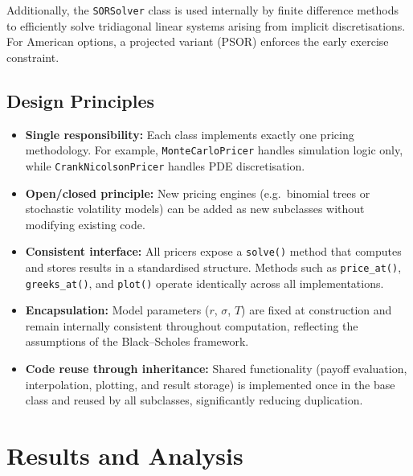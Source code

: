 \documentclass[12pt]{article}
\begin{document}
Additionally, the \texttt{SORSolver} class is used internally by finite
difference methods to efficiently solve tridiagonal linear systems arising
from implicit discretisations. For American options, a projected variant (PSOR)
enforces the early exercise constraint.

\subsection{Design Principles}

\begin{itemize}[leftmargin=2em, itemsep=4pt]

  \item \textbf{Single responsibility:}
  Each class implements exactly one pricing methodology. For example,
  \texttt{MonteCarloPricer} handles simulation logic only, while
  \texttt{CrankNicolsonPricer} handles PDE discretisation.

  \item \textbf{Open/closed principle:}
  New pricing engines (e.g.\ binomial trees or stochastic volatility models)
  can be added as new subclasses without modifying existing code.

  \item \textbf{Consistent interface:}
  All pricers expose a \texttt{solve()} method that computes and stores results
  in a standardised structure. Methods such as \texttt{price\_at()},
  \texttt{greeks\_at()}, and \texttt{plot()} operate identically across all
  implementations.

  \item \textbf{Encapsulation:}
  Model parameters ($r$, $\sigma$, $T$) are fixed at construction and remain
  internally consistent throughout computation, reflecting the assumptions of
  the Black--Scholes framework.

  \item \textbf{Code reuse through inheritance:}
  Shared functionality (payoff evaluation, interpolation, plotting, and result
  storage) is implemented once in the base class and reused by all subclasses,
  significantly reducing duplication.

\end{itemize}
\newpage

\section{Results and Analysis}
\label{sec:results}
\end{document}
